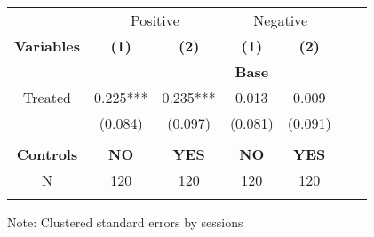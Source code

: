  \begin{table}[htbp]
    \begin{tabular}{c c c c c c c }
    \toprule
    &\multicolumn{2}{c}{Positive}         &\multicolumn{2}{c}{Negative}      \\

    \textbf{Variables} & \textbf{(1)} & \textbf{(2)}  & \textbf{(1)} & \textbf{(2)}              \\ 

    \textbf & \textbf & \textbf & \textbf{ Base } & \textbf   \\ 

    \midrule
     Treated           &  0.225***   & 0.235***    & 0.013     & 0.009  \\
                       & (0.084)     & (0.097)     & (0.081)    & (0.091)   \\
                       &             &             &            &                  \\
\midrule
    
\textbf{Controls} & \textbf{ NO } & \textbf{YES}  & \textbf{ NO } & \textbf{YES}  \\ 
    \midrule
     N                  &   120          &      120  &     120  &     120        \\          
    \bottomrule
    \addlinespace[1ex]
    \multicolumn{3}{l}{\textsuperscript{***}$p<0.01$, 
      \textsuperscript{**}$p<0.05$, 
      \textsuperscript{*}$p<0.1$}
    \end{tabular}
    \newline
    Note: Clustered standard errors by sessions
\end{table}
